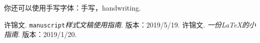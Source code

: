 \documentclass[9pt,oneside,mpar,cn]{manuscript}
\begin{document}
    你还可以使用手写字体：{\handwriting 手写}，{\enhandwriting\normalsize handwriting}. 
    
    \vspace{-0.5\baselineskip}
    \begin{thebibliography}{}
         许锦文. \texttt{manuscript}\textit{样式文稿使用指南}. 版本：2019/5/19.
         许锦文. \textit{一份\emph{\LaTeX}的小指南}. 版本：2019/1/20.
    \end{thebibliography}
\end{document}
